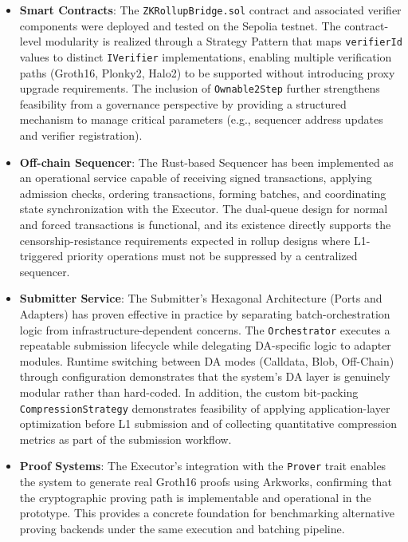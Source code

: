 \begin{itemize}
    \item \textbf{Smart Contracts}: The \texttt{ZKRollupBridge.sol} contract and associated verifier components were deployed and tested on the Sepolia testnet. The contract-level modularity is realized through a Strategy Pattern that maps \texttt{verifierId} values to distinct \texttt{IVerifier} implementations, enabling multiple verification paths (Groth16, Plonky2, Halo2) to be supported without introducing proxy upgrade requirements. The inclusion of \texttt{Ownable2Step} further strengthens feasibility from a governance perspective by providing a structured mechanism to manage critical parameters (e.g., sequencer address updates and verifier registration).
    
    \item \textbf{Off-chain Sequencer}: The Rust-based Sequencer has been implemented as an operational service capable of receiving signed transactions, applying admission checks, ordering transactions, forming batches, and coordinating state synchronization with the Executor. The dual-queue design for normal and forced transactions is functional, and its existence directly supports the censorship-resistance requirements expected in rollup designs where L1-triggered priority operations must not be suppressed by a centralized sequencer.
    
    \item \textbf{Submitter Service}: The Submitter’s Hexagonal Architecture (Ports and Adapters) has proven effective in practice by separating batch-orchestration logic from infrastructure-dependent concerns. The \texttt{Orchestrator} executes a repeatable submission lifecycle while delegating DA-specific logic to adapter modules. Runtime switching between DA modes (Calldata, Blob, Off-Chain) through configuration demonstrates that the system’s DA layer is genuinely modular rather than hard-coded. In addition, the custom bit-packing \texttt{CompressionStrategy} demonstrates feasibility of applying application-layer optimization before L1 submission and of collecting quantitative compression metrics as part of the submission workflow.
    
    \item \textbf{Proof Systems}: The Executor’s integration with the \texttt{Prover} trait enables the system to generate real Groth16 proofs using Arkworks, confirming that the cryptographic proving path is implementable and operational in the prototype. This provides a concrete foundation for benchmarking alternative proving backends under the same execution and batching pipeline.
\end{itemize}

